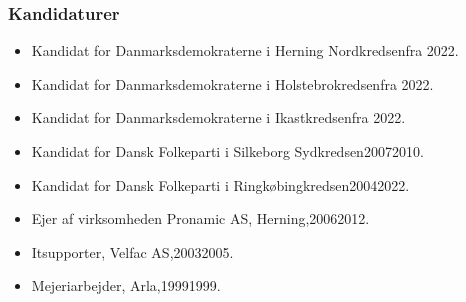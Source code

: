 \documentclass[11pt, a4paper]{awesome-cv}
\begin{document}
\begin{cvletter}
\subsubsection*{Kandidaturer}
\begin{itemize}
\item Kandidat for Danmarksdemokraterne i Herning Nordkredsenfra 2022.
\item Kandidat for Danmarksdemokraterne i Holstebrokredsenfra 2022.
\item Kandidat for Danmarksdemokraterne i Ikastkredsenfra 2022.
\item Kandidat for Dansk Folkeparti i Silkeborg Sydkredsen20072010.
\item Kandidat for Dansk Folkeparti i Ringkøbingkredsen20042022.
\end{itemize}
\begin{itemize}
\item Ejer af virksomheden Pronamic AS, Herning,20062012.
\item Itsupporter, Velfac AS,20032005.
\item Mejeriarbejder, Arla,19991999.
\end{itemize}
\end{cvletter}
\end{document}
